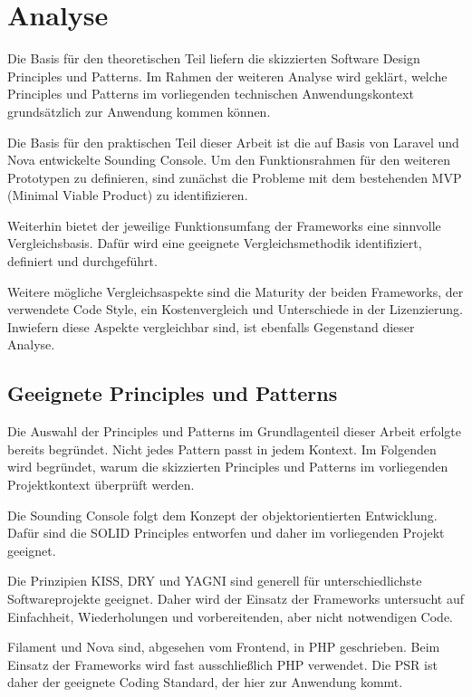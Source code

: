 \section{Analyse}
Die Basis für den theoretischen Teil liefern die skizzierten Software Design Principles und Patterns.
Im Rahmen der weiteren Analyse wird geklärt, welche Principles und Patterns im vorliegenden technischen Anwendungskontext grundsätzlich zur Anwendung kommen können.

Die Basis für den praktischen Teil dieser Arbeit ist die auf Basis von Laravel und Nova entwickelte Sounding Console.
Um den Funktionsrahmen für den weiteren Prototypen zu definieren, sind zunächst die Probleme mit dem bestehenden MVP (Minimal Viable Product) zu identifizieren.

Weiterhin bietet der jeweilige Funktionsumfang der Frameworks eine sinnvolle Vergleichsbasis.
Dafür wird eine geeignete Vergleichsmethodik identifiziert, definiert und durchgeführt.

Weitere mögliche Vergleichsaspekte sind die Maturity der beiden Frameworks, der verwendete Code Style, ein Kostenvergleich und Unterschiede in der Lizenzierung.
Inwiefern diese Aspekte vergleichbar sind, ist ebenfalls Gegenstand dieser Analyse.

\subsection{Geeignete Principles und Patterns}
Die Auswahl der Principles und Patterns im Grundlagenteil dieser Arbeit erfolgte bereits begründet.
Nicht jedes Pattern passt in jedem Kontext.
Im Folgenden wird begründet, warum die skizzierten Principles und Patterns im vorliegenden Projektkontext überprüft werden.

Die Sounding Console folgt dem Konzept der objektorientierten Entwicklung.
Dafür sind die SOLID Principles entworfen und daher im vorliegenden Projekt geeignet.

Die Prinzipien KISS, DRY und YAGNI sind generell für unterschiedlichste Softwareprojekte geeignet.
Daher wird der Einsatz der Frameworks untersucht auf Einfachheit, Wiederholungen und vorbereitenden, aber nicht notwendigen Code.

Filament und Nova sind, abgesehen vom Frontend, in PHP geschrieben.
Beim Einsatz der Frameworks wird fast ausschließlich PHP verwendet.
Die PSR ist daher der geeignete Coding Standard, der hier zur Anwendung kommt.

\newpage

